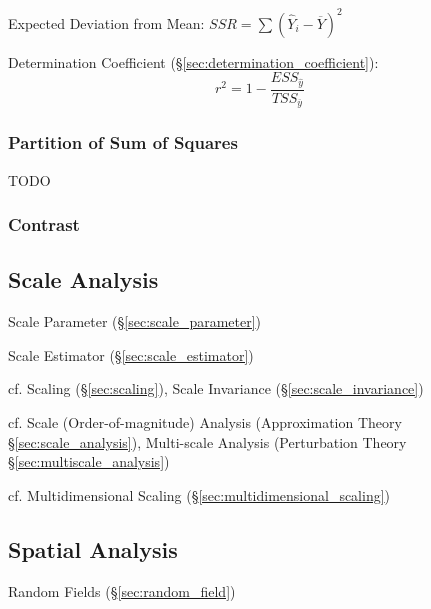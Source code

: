 Expected Deviation from Mean: $SSR = \sum(\hat{Y}_i - \overline{Y})^2$

Determination Coefficient (\S\ref{sec:determination_coefficient}):
\[
  r^2 = 1 - \frac{
    ESS_{\hat{y}}
  }{
    TSS_{\overline{y}}
  }
\]



\subsubsection{Partition of Sum of Squares}\label{sec:partition_squares}

TODO



\subsubsection{Contrast}\label{sec:contrast}



\subsection{Scale Analysis}\label{sec:statistical_scale}

Scale Parameter (\S\ref{sec:scale_parameter})

Scale Estimator (\S\ref{sec:scale_estimator})

cf. Scaling (\S\ref{sec:scaling}), Scale Invariance
(\S\ref{sec:scale_invariance})

\fist cf. Scale (Order-of-magnitude) Analysis (Approximation Theory
\S\ref{sec:scale_analysis}), Multi-scale Analysis (Perturbation Theory
\S\ref{sec:multiscale_analysis})

cf. Multidimensional Scaling (\S\ref{sec:multidimensional_scaling})



\subsection{Spatial Analysis}\label{sec:spatial_analysis}

Random Fields (\S\ref{sec:random_field})


